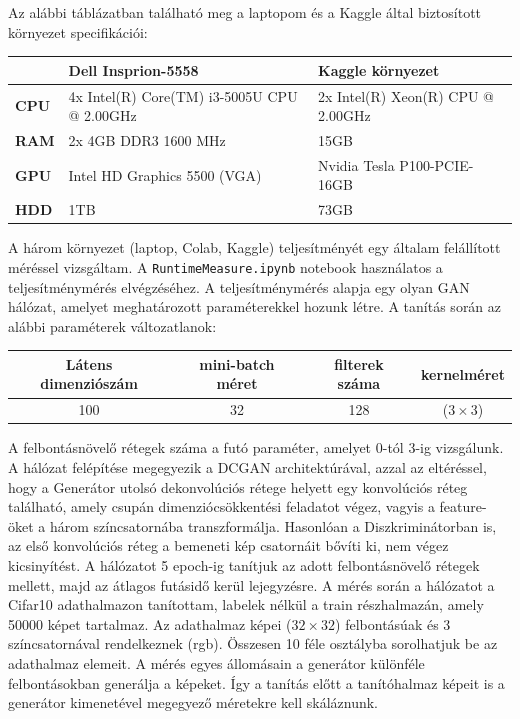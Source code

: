 Az alábbi táblázatban található meg a laptopom és a Kaggle által biztosított környezet specifikációi:
\begin{center}
\begin{tabular}{ p{1.2cm}||p{6cm}|p{6cm}  }
	  & Dell Insprion-5558 & Kaggle környezet\\
	\hline
	\textbf{CPU} & 4x Intel(R) Core(TM) i3-5005U CPU @ 2.00GHz & 2x Intel(R) Xeon(R) CPU @ 2.00GHz\\
	\textbf{RAM} & 2x 4GB DDR3 1600 MHz & 15GB\\
	\textbf{GPU} & Intel HD Graphics 5500 (VGA) & Nvidia Tesla P100-PCIE-16GB\\
	\textbf{HDD} & 1TB & 73GB
\end{tabular}
\end{center}
A három környezet (laptop, Colab, Kaggle) teljesítményét egy általam felállított méréssel vizsgáltam.
A \texttt{RuntimeMeasure.ipynb} notebook használatos a teljesítménymérés elvégzéséhez.
A teljesítménymérés alapja egy olyan GAN hálózat, amelyet meghatározott paraméterekkel hozunk létre.
A tanítás során az alábbi paraméterek változatlanok:
\begin{center}
\begin{tabular}{ c|c|c|c }
	Látens dimenziószám & mini-batch méret & filterek száma & kernelméret\\
	\hline
	100 & 32 & 128 & ($3\times 3$)
\end{tabular}
\end{center}
A felbontásnövelő rétegek száma a futó paraméter, amelyet 0-tól 3-ig vizsgálunk.
A hálózat felépítése megegyezik a DCGAN architektúrával, azzal az eltéréssel, hogy a Generátor utolsó dekonvolúciós rétege helyett egy konvolúciós réteg található, amely csupán dimenziócsökkentési feladatot végez, vagyis a feature-öket a három színcsatornába transzformálja. Hasonlóan a Diszkriminátorban is, az első konvolúciós réteg a bemeneti kép csatornáit bővíti ki, nem végez kicsinyítést.
A hálózatot 5 epoch-ig tanítjuk az adott felbontásnövelő rétegek mellett, majd az átlagos futásidő kerül lejegyzésre.
A mérés során a hálózatot a Cifar10 \cite{krizhevsky2009learning} adathalmazon tanítottam, labelek nélkül a train részhalmazán, amely 50000 képet tartalmaz. Az adathalmaz képei ($32 \times 32$) felbontásúak és 3 színcsatornával rendelkeznek (rgb). Összesen 10 féle osztályba sorolhatjuk be az adathalmaz elemeit.
A mérés egyes állomásain a generátor különféle felbontásokban generálja a képeket. Így a tanítás előtt a tanítóhalmaz képeit is a generátor kimenetével megegyező méretekre kell skáláznunk.

